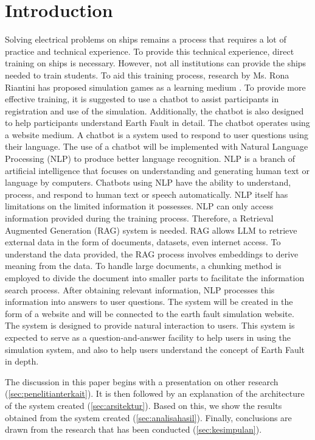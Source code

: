 \section{Introduction}
\label{sec:pendahuluan}


Solving electrical problems on ships remains a process that requires a lot of practice and technical experience. To provide this technical experience, direct training on ships is necessary. However, not all institutions can provide the ships needed to train students. To aid this training process, research by Ms. Rona Riantini has proposed simulation games as a learning medium \cite{riantini2022serious}. To provide more effective training, it is suggested to use a chatbot to assist participants in registration and use of the simulation. Additionally, the chatbot is also designed to help participants understand Earth Fault in detail. The chatbot operates using a website medium. A chatbot is a system used to respond to user questions using their language. The use of a chatbot will be implemented with Natural Language Processing (NLP) to produce better language recognition. NLP is a branch of artificial intelligence that focuses on understanding and generating human text or language by computers. Chatbots using NLP have the ability to understand, process, and respond to human text or speech automatically. NLP itself has limitations on the limited information it possesses. NLP can only access information provided during the training process. Therefore, a Retrieval Augmented Generation (RAG) system is needed. RAG allows LLM to retrieve external data in the form of documents, datasets, even internet access. To understand the data provided, the RAG process involves embeddings to derive meaning from the data. To handle large documents, a chunking method is employed to divide the document into smaller parts to facilitate the information search process. After obtaining relevant information, NLP processes this information into answers to user questions. The system will be created in the form of a website and will be connected to the earth fault simulation website. The system is designed to provide natural interaction to users. This system is expected to serve as a question-and-answer facility to help users in using the simulation system, and also to help users understand the concept of Earth Fault in depth.

The discussion in this paper begins with a presentation on other research (\ref{sec:penelitianterkait}).
It is then followed by an explanation of the architecture of the system created (\ref{sec:arsitektur}).
Based on this, we show the results obtained from the system created (\ref{sec:analisahasil}).
Finally, conclusions are drawn from the research that has been conducted (\ref{sec:kesimpulan}).

